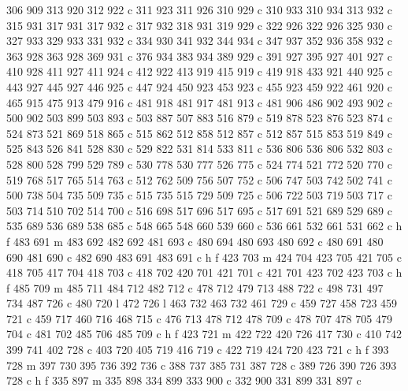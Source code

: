 {{        306 909 313 920 312 922 c
        311 923 311 926 310 929 c
        310 933 310 934 313 932 c
        315 931 317 931 317 932 c
        317 932 318 931 319 929 c
        322 926 322 926 325 930 c
        327 933 329 933 331 932 c
        334 930 341 932 344 934 c
        347 937 352 936 358 932 c
        363 928 363 928 369 931 c
        376 934 383 934 389 929 c
        391 927 395 927 401 927 c
        410 928 411 927 411 924 c
        412 922 413 919 415 919 c
        419 918 433 921 440 925 c
        443 927 445 927 446 925 c
        447 924 450 923 453 923 c
        455 923 459 922 461 920 c
        465 915 475 913 479 916 c
        481 918 481 917 481 913 c
        481 906 486 902 493 902 c
        500 902 503 899 503 893 c
        503 887 507 883 516 879 c
        519 878 523 876 523 874 c
        524 873 521 869 518 865 c
        515 862 512 858 512 857 c
        512 857 515 853 519 849 c
        525 843 526 841 528 830 c
        529 822 531 814 533 811 c
        536 806 536 806 532 803 c
        528 800 528 799 529 789 c
        530 778 530 777 526 775 c
        524 774 521 772 520 770 c
        519 768 517 765 514 763 c
        512 762 509 756 507 752 c
        506 747 503 742 502 741 c
        500 738 504 735 509 735 c
        515 735 515 729 509 725 c
        506 722 503 719 503 717 c
        503 714 510 702 514 700 c
        516 698 517 696 517 695 c
        517 691 521 689 529 689 c
        535 689 536 689 538 685 c
        548 665 548 660 539 660 c
        536 661 532 661 531 662 c
        h f
        483 691 m
        483 692 482 692 481 693 c
        480 694 480 693 480 692 c
        480 691 480 690 481 690 c
        482 690 483 691 483 691 c
        h f
        423 703 m
        424 704 423 705 421 705 c
        418 705 417 704 418 703 c
        418 702 420 701 421 701 c
        421 701 423 702 423 703 c
        h f
        485 709 m
        485 711 484 712 482 712 c
        478 712 479 713 488 722 c
        498 731 497 734 487 726 c
        480 720 l
        472 726 l
        463 732 463 732 461 729 c
        459 727 458 723 459 721 c
        459 717 460 716 468 715 c
        476 713 478 712 478 709 c
        478 707 478 705 479 704 c
        481 702 485 706 485 709 c
        h f
        423 721 m
        422 722 420 726 417 730 c
        410 742 399 741 402 728 c
        403 720 405 719 416 719 c
        422 719 424 720 423 721 c
        h f
        393 728 m
        397 730 395 736 392 736 c
        388 737 385 731 387 728 c
        389 726 390 726 393 728 c
        h f
        335 897 m
        335 898 334 899 333 900 c
        332 900 331 899 331 897 c
}}
